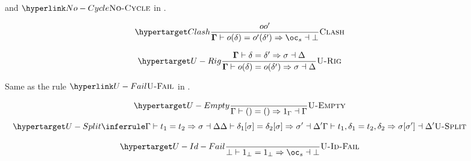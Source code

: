 \begin{figure*}
\begin{raggedright}
{\begin{minipage}[t]{1\textwidth - 2\fboxsep - 2\fboxrule}
\begin{flushleft}
\begin{minipage}[c]{0.43\columnwidth}
and $\refrule{No-Cycle}$ in .%
\end{minipage}
\par\end{flushleft}
\vspace{-1em}%
\begin{minipage}[c]{0.49\textwidth}%
\begin{flushleft}
\par\end{flushleft}%
\end{minipage}%
\begin{minipage}[c]{0.5\columnwidth}%
\begin{flushleft}
\[
\labellabelrule{\dfrac{o\neq o'}{\dotmcontext{\Gamma}\vdash o(\delta)=o'(\delta')\Rightarrow\bang_{s}\dashv\bot}}{Clash}
\]
\par\end{flushleft}
\begin{flushleft}
\[
\labellabelrule{\dfrac{\dotmcontext{\Gamma}\vdash\delta=\delta'\Rightarrow\sigma\dashv\Delta}{\dotmcontext{\Gamma}\vdash o(\delta)=o(\delta')\Rightarrow\sigma\dashv\Delta}}{U-Rig}
\]
\par\end{flushleft}%
\end{minipage}

\vspace{0.2em}

\begin{minipage}[c]{0.4\textwidth}%
\begin{flushleft}
\par\end{flushleft}%
\end{minipage}%
\begin{minipage}[c]{0.6\columnwidth}%
\begin{center}
Same as the rule $\refrule{U-Fail}$ in .
\par\end{center}%
\end{minipage}

\begin{minipage}[c]{0.49\columnwidth}%
\begin{flushleft}
\par\end{flushleft}%
\end{minipage}%
\begin{minipage}[c]{0.5\columnwidth}%
\[
\labellabelrule{\unificationempty}{U-Empty}
\]
\[
\labellabelrule{\unificationstepwisenovec}{U-Split}
\]

\[
\labellabelrule{\dfrac{}{\bot\vdash1_{\bot}=1_{\bot}\Rightarrow\bang_{s}\dashv\bot}}{U-Id-Fail}
\]
%
\end{minipage}%
\end{minipage}}
\par\end{raggedright}
\end{figure*}

